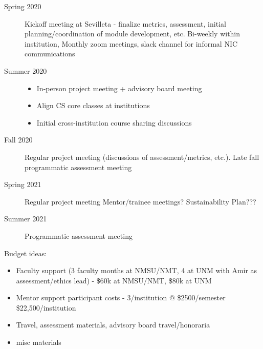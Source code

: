 \begin{description}
    \item[Spring 2020] Kickoff meeting at Sevilleta - finalize metrics, assessment, initial planning/coordination of module development, etc. Bi-weekly within institution, Monthly zoom meetings, slack channel for informal NIC communications
    \item[Summer 2020] 
    \begin{itemize}
        \item In-person project meeting + advisory board meeting
        \item Align CS core classes at institutions 
        \item Initial cross-institution course sharing discussions
    \end{itemize}
    \item[Fall 2020] Regular project meeting (discussions of assessment/metrics, etc.). Late fall programmatic assessment meeting
    \item[Spring 2021] Regular project meeting Mentor/trainee meetings?  Sustainability Plan???
    \item[Summer 2021] Programmatic assessment meeting
\end{description}

Budget ideas:
\begin{itemize}
    \item Faculty support (3 faculty months at NMSU/NMT, 4 at UNM with Amir as assessment/ethics lead) - \$60k at NMSU/NMT, \$80k at UNM
    \item Mentor support participant costs - 3/institution @ \$2500/semester \$22,500/institution
    \item Travel, assessment materials, advisory board travel/honoraria
    \item misc materials
\end{itemize}

